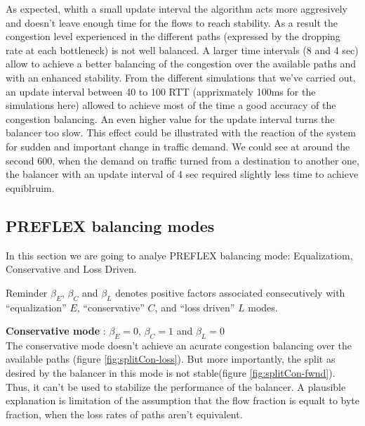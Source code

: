 As expected, whith a small update interval the algorithm acts more aggresively and doesn't leave enough time for the flows to reach stability. As a result the congestion level experienced in the different paths (expressed by the dropping rate at each bottleneck) is not well balanced. A larger time intervals (8 and 4 sec) allow to achieve a better balancing of the congestion over the available paths and with an enhanced stability. From the different simulations that we've carried out, an update interval between 40 to 100 RTT (apprixmately 100ms for the simulations here) allowed to achieve most of the time a good accuracy of the congestion balancing. An even higher value for the update interval turns the balancer too slow. This effect could be illustrated with the reaction of the system for sudden and important change in traffic demand. We could see at around the second 600, when the demand on traffic turned from a destination to another one, the balancer with an update interval of 4 sec required slightly less time to achieve equiblruim.    
 
 \clearpage


\subsection{PREFLEX balancing modes}

In this section we are going to analye PREFLEX balancing mode: Equalizatiom, Conservative and Loss Driven.

Reminder
$\beta_{E}$, $\beta_{C}$ and $\beta_{L}$ denotes positive factors associated consecutively with “equalization” $E$, “conservative” $C$, and “loss driven” $L$ modes.

{\bf Conservative mode} : $\beta_{E}=0$, $\beta_{C}=1$ and $\beta_{L}=0$
\\The conservative mode doesn't achieve an acurate congestion balancing over the available paths (figure \ref{fig:splitCon-loss}). But more importantly, the split as desired by the balancer in this mode is not stable(figure \ref{fig:splitCon-fwnd}). Thus, it can't be used to stabilize the performance of the balancer. A plausible explanation is limitation of the assumption that the flow fraction is equalt to byte fraction, when the loss rates of paths aren't equivalent.

